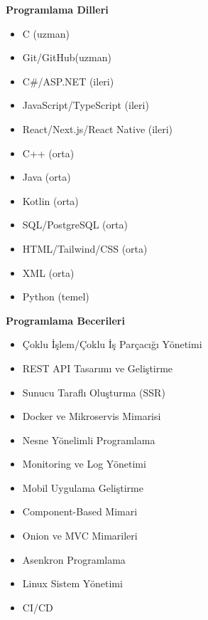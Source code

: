 \documentclass[a4paper,11pt]{article}
\begin{document}
\vspace{-0.5em}

\noindent
\begin{minipage}[t]{0.48\textwidth}
    \textbf{Programlama Dilleri}
    \vspace{0em}
    \begin{itemize}
        \item C (uzman)
        \item Git/GitHub(uzman)
        \item C\#/ASP.NET (ileri)
        \item JavaScript/TypeScript (ileri)
        \item React/Next.js/React Native (ileri)
        \item C++ (orta)
        \item Java (orta)
        \item Kotlin (orta)
        \item SQL/PostgreSQL (orta)
        \item HTML/Tailwind/CSS (orta)
        \item XML (orta)
        \item Python (temel)
    \end{itemize}
\end{minipage}%
\hfill
\begin{minipage}[t]{0.48\textwidth}
    \textbf{Programlama Becerileri}
    \vspace{0em}
\begin{itemize}
    \item Çoklu İşlem/Çoklu İş Parçacığı Yönetimi
    \item REST API Tasarımı ve Geliştirme
    \item Sunucu Taraflı Oluşturma (SSR)
    \item Docker ve Mikroservis Mimarisi
    \item Nesne Yönelimli Programlama
    \item Monitoring ve Log Yönetimi
    \item Mobil Uygulama Geliştirme
    \item Component-Based Mimari
    \item Onion ve MVC Mimarileri
    \item Asenkron Programlama
    \item Linux Sistem Yönetimi
    \item CI/CD
\end{itemize}
\end{minipage}
\end{document}
